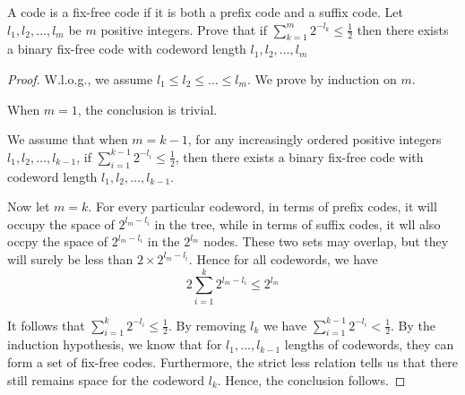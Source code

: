 \begin{exercise}{ A code is a fix-free code if it is both a prefix code and a suffix code. Let $l_{1}, l_{2}, \ldots, l_{m}$ be $m$ positive integers. Prove that if
  $\sum_{k=1}^{m} 2^{-l_{k}} \leq \frac{1}{2}$
  then there exists a binary fix-free code with codeword length $l_{1}, l_{2}, \ldots, l_{m}$}
  \begin{proof}
  W.l.o.g., we assume $l_1\le l_2 \le \ldots \le l_m$. We prove by induction on $m$.
  
  When $m=1$, the conclusion is trivial.

  We assume that when $m=k-1$, for any increasingly ordered positive integers $l_1,l_2,\ldots,l_{k-1}$, if $\sum_{i=1}^{k-1} 2^{-l_i} \le \frac{1}{2}$, then there exists a binary fix-free code with codeword length $l_1,l_2,\ldots,l_{k-1}$.

  Now let $m=k$. For every particular codeword, in terms of prefix codes, it will occupy the space of $2^{l_m - l_i}$ in the tree, while in terms of suffix codes, it wll also occpy the space of $2^{l_m - l_i}$ in the $2^{l_m}$ nodes. These two sets may overlap, but they will surely be less than $2\times 2^{l_m - l_i}$. Hence for all codewords, we have
  \begin{equation}
    2 \sum_{i=1}^{k} 2^{l_m - l_i} \le 2^{l_m} 
  \end{equation}
  
  
  It follows that $\sum_{i=1}^{k} 2^{-l_i} \le \frac{1}{2}$. By removing $l_k$ we have $\sum_{i=1}^{k-1} 2^{-l_i} < \frac{1}{2}$. By the induction hypothesis, we know that for $l_1,\ldots,l_{k-1}$ lengths of codewords, they can form a set of fix-free codes. Furthermore, the strict less relation tells us that there still remains space for the codeword $l_k$. Hence, the conclusion follows.
  \end{proof}
  \label{ex2}
\end{exercise}


